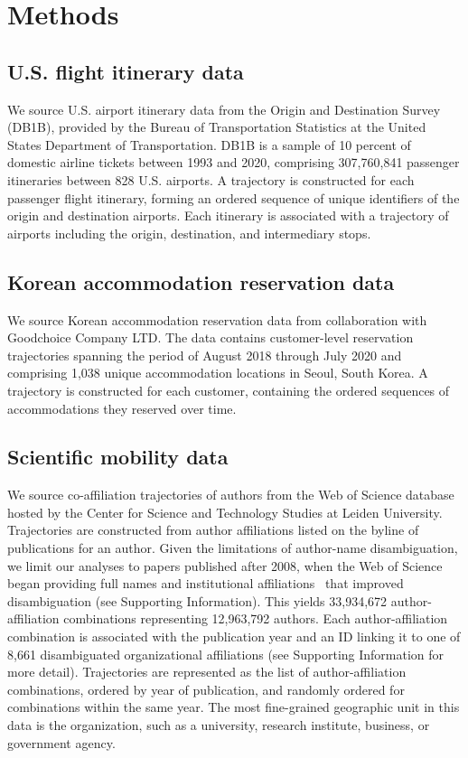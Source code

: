 \documentclass[12pt]{article} %
\def\SI{Supporting Information}
\begin{document}
%
%
\section*{Methods}
\label{sec:datamethods} %


\subsection*{U.S. flight itinerary data}
We source U.S. airport itinerary data from the Origin and Destination Survey (DB1B), provided by the Bureau of Transportation Statistics at the United States Department of Transportation.
DB1B is a sample of 10 percent of domestic airline tickets between 1993 and 2020, comprising 307,760,841 passenger itineraries between 828 U.S. airports.
A trajectory is constructed for each passenger flight itinerary, forming an ordered sequence of unique identifiers of the origin and destination airports.
Each itinerary is associated with a trajectory of airports including the origin, destination, and intermediary stops.


\subsection*{Korean accommodation reservation data}
We source Korean accommodation reservation data from collaboration with Goodchoice Company LTD.
The data contains customer-level reservation trajectories spanning the period of August 2018 through July 2020 and comprising 1,038 unique accommodation locations in Seoul, South Korea.
A trajectory is constructed for each customer, containing the ordered sequences of accommodations they reserved over time.

\subsection*{Scientific mobility data}
We source co-affiliation trajectories of authors from the Web of Science database hosted by the Center for Science and Technology Studies at Leiden University.
Trajectories are constructed from author affiliations listed on the byline of publications for an author.
Given the limitations of author-name disambiguation, we limit our analyses to papers published after 2008, when the Web of Science began providing full names and institutional affiliations~\autocite{caron2014disambiguation} that improved disambiguation (see \SI).
This yields 33,934,672 author-affiliation combinations representing 12,963,792 authors.
Each author-affiliation combination is associated with the publication year and an ID linking it to one of 8,661 disambiguated organizational affiliations (see \SI{} for more detail).
Trajectories are represented as the list of author-affiliation combinations, ordered by year of publication, and randomly ordered for combinations within the same year. The most fine-grained geographic unit in this data is the organization, such as a university, research institute, business, or government agency.
\end{document}
